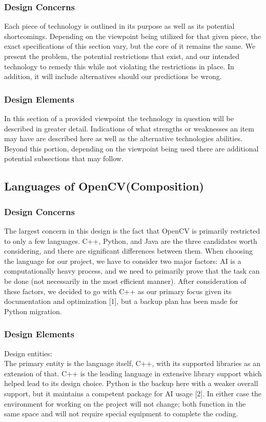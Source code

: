 \documentclass[onecolumn, draftclsnofoot,10pt, compsoc]{IEEEtran}
\begin{document}
\subsubsection{Design Concerns}
Each piece of technology is outlined in its purpose as well as its potential shortcomings. Depending on the viewpoint being utilized for that given piece, the exact specifications of this section vary, but the core of it remains the same. We present the problem, the potential restrictions that exist, and our intended technology to remedy this while not violating the restrictions in place. In addition, it will include alternatives should our predictions be wrong.

\subsubsection{Design Elements}
In this section of a provided viewpoint the technology in question will be described in greater detail. Indications of what strengths or weaknesses an item may have are described here as well as the alternative technologies abilities. Beyond this portion, depending on the viewpoint being used there are additional potential subsections that may follow.

\subsection{Languages of OpenCV(Composition)}
\subsubsection{Design Concerns}
The largest concern in this design is the fact that OpenCV is primarily restricted to only a few languages. C++, Python, and Java are the three candidates worth considering, and there are significant differences between them. When choosing the language for our project, we have to consider two major factors: AI is a computationally heavy process, and we need to primarily prove that the task can be done (not necessarily in the most efficient manner). After consideration of these factors, we decided to go with C++ as our primary focus given its documentation and optimization [1], but a backup plan has been made for Python migration.

\subsubsection{Design Elements}
	Design entities: \\
The primary entity is the language itself, C++, with its supported libraries as an extension of that. C++ is the leading language in extensive library support which helped lead to its design choice. Python is the backup here with a weaker overall support, but it maintains a competent package for AI usage [2]. In either case the environment for working on the project will not change; both function in the same space and will not require special equipment to complete the coding.\\
\end{document}

